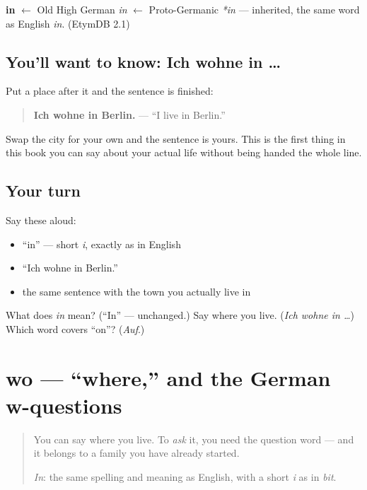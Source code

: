 \begin{cousinweb}
\textbf{in} $\leftarrow$ Old High German \emph{in} $\leftarrow$ Proto-Germanic \emph{*in} — inherited, the same word as English \emph{in}. (EtymDB 2.1)
\end{cousinweb}

\subsection*{You'll want to know: Ich wohne in …}
Put a place after it and the sentence is finished:

\begin{quote}
\textbf{Ich wohne in Berlin.} — \textquotedblleft{}I live in Berlin.\textquotedblright{}
\end{quote}

Swap the city for your own and the sentence is yours. This is the first thing in this book you can say about your actual life without being handed the whole line.

\subsection*{Your turn}
Say these aloud:

\begin{itemize}
\raggedright
  \item \textquotedblleft{}in\textquotedblright{} — short \emph{i}, exactly as in English
  \item \textquotedblleft{}Ich wohne in Berlin.\textquotedblright{}
  \item the same sentence with the town you actually live in
\end{itemize}

\begin{tcolorbox}[breakable,colback=teal!4,colframe=teal!35!black,title={Before you move on}]
What does \emph{in} mean? (\textquotedblleft{}In\textquotedblright{} — unchanged.) Say where you live. (\emph{Ich wohne in …}) Which word covers \textquotedblleft{}on\textquotedblright{}? (\emph{Auf}.)
\end{tcolorbox}
\section[wo]{wo — \textquotedblleft{}where,\textquotedblright{} and the German w-questions}

\label{lesson:GE-C05-wo}



\begin{quote}
You can say where you live. To \emph{ask} it, you need the question word — and it belongs to a family you have already started.

\emph{In}: the same spelling and meaning as English, with a short \emph{i} as in \emph{bit}.
\end{quote}

